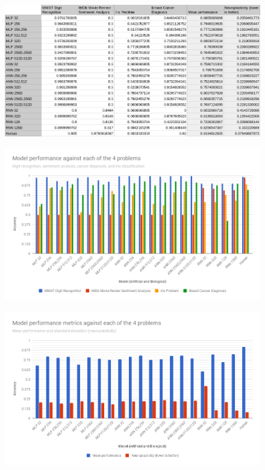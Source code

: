 \documentclass[]{report}
\begin{document}
\begin{figure}[H]
	\centering
	\includegraphics[width=\textwidth]{results.png}
	\label{fig:results}
\end{figure}

\begin{figure}[H]
	\centering
	\includegraphics[width=\linewidth]{chart.png}
	\label{fig:chart0}
\end{figure}

\begin{figure}[H]
	\centering
	\includegraphics[width=\linewidth]{chart1.png}
	\label{fig:chart1}
\end{figure}
\end{document}
